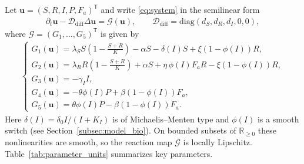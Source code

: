 \documentclass[pdflatex,sn-mathphys-ay]{sn-jnl}
\theoremstyle{thmstyleone}
\theoremstyle{definition}
\theoremstyle{remark}
\begin{document}
Let $\mathbf u=(S,R,I,P,F_a)^{\mathsf T}$ and write \eqref{eq:system} in the semilinear form
\begin{align}
\label{eq:base_vector_form}
\partial_t\mathbf u-\mathcal D_{\mathrm{diff}}\Delta \mathbf u=\mathcal G(\mathbf u),
\qquad 
\mathcal D_{\mathrm{diff}}=\mathrm{diag}(d_S,d_R,d_I,0,0),
\end{align}
where $\mathcal G=(G_1,\dots,G_5)^{\mathsf T}$ is given by
\begin{align*}
\begin{cases}
G_1(\mathbf{u}) = \lambda_S S\left(1-\tfrac{S+R}{K}\right)-\alpha S-\delta(I)S+\xi(1-\phi(I))R,\\[4pt]
G_2(\mathbf{u}) = \lambda_R R\left(1-\tfrac{S+R}{K}\right)+\alpha S+\eta\,\phi(I)F_aR-\xi(1-\phi(I))R,\\[4pt]
G_3(\mathbf{u}) = -\gamma_I I,\\[4pt]
G_4(\mathbf{u}) = -\theta \phi(I)P+\beta(1-\phi(I))F_a,\\[4pt]
G_5(\mathbf{u}) = \theta \phi(I)P-\beta(1-\phi(I))F_a.
\end{cases}
\end{align*}
Here $\delta(I)=\delta_0 I/(I+K_I)$ is of Michaelis--Menten type \citep{cornish2015one} and $\phi(I)$ is a smooth switch (see Section~\ref{subsec:model_bio}). 
On bounded subsets of $\mathbb{R}_{\ge 0}$ these nonlinearities are smooth, so the reaction map $\mathcal G$ is locally Lipschitz. 
Table~\ref{tab:parameter_units} summarizes key parameters.
\end{document}
